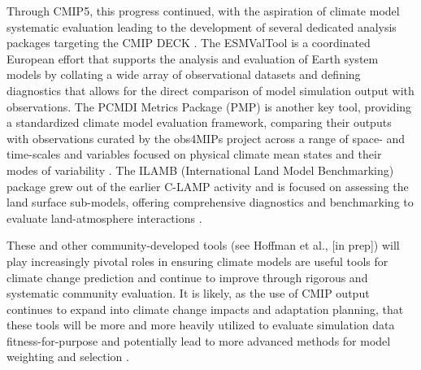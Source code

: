 \documentclass[gmd, preprint]{copernicus}
\begin{document}
Through CMIP5, this progress continued, with the aspiration of climate model systematic evaluation leading to the development of several dedicated analysis packages targeting the CMIP DECK \citep{eyring_towards_2016}. The ESMValTool \citep[Earth System Model Evaluation Tool;][]{eyring_esmvaltool_2016,righi_earth_2020} is a coordinated European effort that supports the analysis and evaluation of Earth system models by collating a wide array of observational datasets and defining diagnostics that allows for the direct comparison of model simulation output with observations. The PCMDI Metrics Package (PMP) is another key tool, providing a standardized climate model evaluation framework, comparing their outputs with observations curated by the obs4MIPs project across a range of space- and time-scales and variables focused on physical climate mean states and their modes of variability \citep{gleckler_more_2016,lee_systematic_2024}. The ILAMB (International Land Model Benchmarking) package grew out of the earlier C-LAMP activity \citep{hoffman_results_2007} and is focused on assessing the land surface sub-models, offering comprehensive diagnostics and benchmarking to evaluate land-atmosphere interactions \citep{collier_international_2018}.

These and other community-developed tools (see Hoffman et al., [in prep]) will play increasingly pivotal roles in ensuring climate models are useful tools for climate change prediction and continue to improve through rigorous and systematic community evaluation. It is likely, as the use of CMIP output continues to expand into climate change impacts and adaptation planning, that these tools will be more and more heavily utilized to evaluate simulation data fitness-for-purpose and potentially lead to more advanced methods for model weighting and selection \citep{eyring_taking_2019}.
\end{document}

